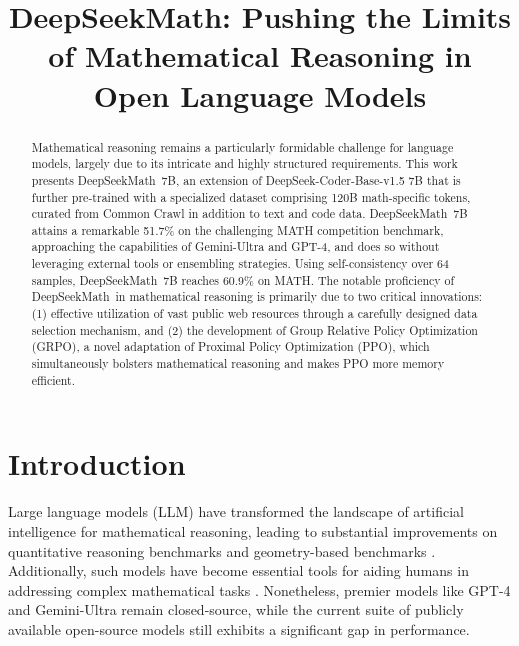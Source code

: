 \title{DeepSeekMath: Pushing the Limits of Mathematical Reasoning in Open Language Models}

\begin{abstract}
Mathematical reasoning remains a particularly formidable challenge for language models, largely due to its intricate and highly structured requirements. This work presents DeepSeekMath~7B, an extension of DeepSeek-Coder-Base-v1.5 7B that is further pre-trained with a specialized dataset comprising 120B math-specific tokens, curated from Common Crawl in addition to text and code data. DeepSeekMath~7B attains a remarkable 51.7\% on the challenging MATH competition benchmark, approaching the capabilities of Gemini-Ultra and GPT-4, and does so without leveraging external tools or ensembling strategies. Using self-consistency over 64 samples, DeepSeekMath~7B reaches 60.9\% on MATH. The notable proficiency of DeepSeekMath~in mathematical reasoning is primarily due to two critical innovations: (1) effective utilization of vast public web resources through a carefully designed data selection mechanism, and (2) the development of Group Relative Policy Optimization (GRPO), a novel adaptation of Proximal Policy Optimization (PPO), which simultaneously bolsters mathematical reasoning and makes PPO more memory efficient.
\end{abstract}

\section{Introduction}

Large language models (LLM) have transformed the landscape of artificial intelligence for mathematical reasoning, leading to substantial improvements on quantitative reasoning benchmarks \citep{MATH} and geometry-based benchmarks \citep{trinh2024solving}. Additionally, such models have become essential tools for aiding humans in addressing complex mathematical tasks \citep{tao}. Nonetheless, premier models like GPT-4 \citep{gpt4} and Gemini-Ultra \citep{gemini} remain closed-source, while the current suite of publicly available open-source models still exhibits a significant gap in performance.


